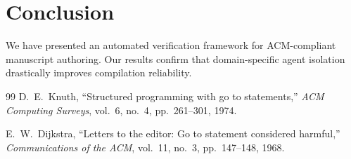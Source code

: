 \documentclass[10pt,twocolumn]{article}
\begin{document}
\section{Conclusion}
We have presented an automated verification framework for ACM-compliant manuscript authoring. Our results confirm that domain-specific agent isolation drastically improves compilation reliability.

\begin{thebibliography}{99}
D.~E.~Knuth, ``Structured programming with go to statements,'' \emph{ACM Computing Surveys}, vol.~6, no.~4, pp.~261--301, 1974.

E.~W.~Dijkstra, ``Letters to the editor: Go to statement considered harmful,'' \emph{Communications of the ACM}, vol.~11, no.~3, pp.~147--148, 1968.
\end{thebibliography}
\end{document}
